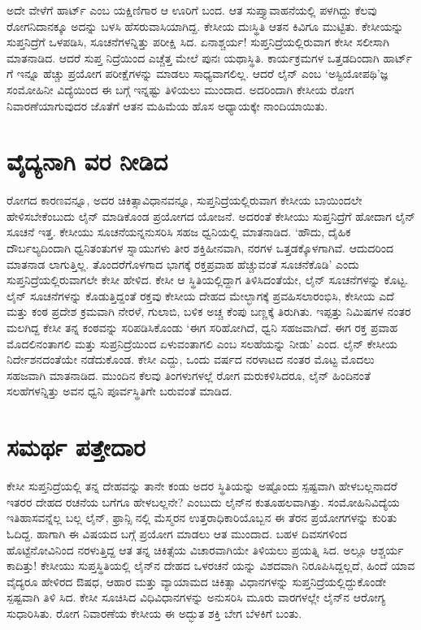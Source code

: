 ಅದೇ ವೇಳೆಗೆ ಹಾರ್ಟ್ ಎಂಬ ಯಕ್ಷಿಣಿಗಾರ ಆ ಊರಿಗೆ ಬಂದ. ಆತ ಸುಪ್ತ್ಯಾವಾಹನೆಯಲ್ಲಿ ಪಳಗಿದ್ದು ಕೆಲವು ರೋಗನಿದಾನಕ್ಕೂ ಅದನ್ನು ಬಳಸಿ ಹೆಸರುವಾಸಿಯಾಗಿದ್ದ. ಕೇಸೀಯ ದುಃಸ್ಥಿತಿ ಆತನ ಕಿವಿಗೂ ಮುಟ್ಟಿತು. ಕೇಸೀಯನ್ನು ಸುಪ್ತನಿದ್ರೆಗೆ ಒಳಪಡಿಸಿ, ಸೂಚನೆಗಳನ್ನಿತ್ತು ಪರೀಕ್ಷಿ ಸಿದ. ಏನಾಶ್ಚರ್ಯ! ಸುಪ್ತನಿದ್ರೆಯಲ್ಲಿರುವಾಗ ಕೇಸೀ ಸಲೀಸಾಗಿ ಮಾತನಾಡಿದ. ಆದರೆ ಸುಪ್ತ ನಿದ್ರೆಯಿಂದ ಎಚ್ಚೆತ್ತ ಮೇಲೆ ಪುನಃ ಯಥಾಸ್ಥಿತಿ. ಕಾರ್ಯಕ್ರಮಗಳ ಒತ್ತಡದಿಂದಾಗಿ ಹಾರ್ಟ್​ಗೆ ಇನ್ನೂ ಹೆಚ್ಚು ಪ್ರಯೋಗ ಪರೀಕ್ಷೆಗಳನ್ನು ಮಾಡಲು ಸಾಧ್ಯವಾಗಲಿಲ್ಲ. ಆದರೆ ಲೈನ್ ಎಂಬ ‘ಅಸ್ಟಿಯೋಪಥಿ’ಜ್ಞ ಸಂಮೋಹಿನೀ ವಿದ್ಯೆಯಿಂದ ಈ ಬಗ್ಗೆ ಇನ್ನಷ್ಟು ತಿಳಿಯಲು ಮುಂದಾದ. ಅದರಿಂದಾಗಿ ಕೇಸೀಯ ರೋಗ ನಿವಾರಣೆಯಾಗುವುದರ ಜೊತೆಗೆ ಆತನ ಮಹಿಮೆಯ ಹೊಸ ಅಧ್ಯಾಯಕ್ಕೇ ನಾಂದಿಯಾಯಿತು.


\section{ವೈದ್ಯನಾಗಿ ವರ ನೀಡಿದ}

ರೋಗದ ಕಾರಣವನ್ನೂ, ಅದರ ಚಿಕಿತ್ಸಾವಿಧಾನವನ್ನೂ, ಸುಪ್ತನಿದ್ರೆಯಲ್ಲಿರುವಾಗ ಕೇಸೀಯ ಬಾಯಿಂದಲೇ ಹೇಳಿಸಬೇಕೆಂಬುದು ಲೈನ್ ಮಾಡಿಕೊಂಡ ಪ್ರಯೋಗದ ಯೋಜನೆ. ಅದರಂತೆ ಕೇಸೀಯು ಸುಪ್ತನಿದ್ರೆಗೆ ಹೋದಾಗ ಲೈನ್ ಸೂಚನೆ ಇತ್ತ. ಕೇಸೀಯು ಸೂಚನೆಯನ್ನನುಸರಿಸಿ ಸಹಜ ಧ್ವನಿಯಲ್ಲಿ ಮಾತನಾಡಿದ. ‘ಹೌದು, ದೈಹಿಕ ದೌರ್ಬಲ್ಯದಿಂದಾಗಿ ಧ್ವನಿತಂತುಗಳ ಸ್ನಾಯುಗಳು ತೀರ ಶಕ್ತಿಹೀನವಾಗಿ, ನರಗಳ ಒತ್ತಡಕ್ಕೊಳಗಾಗಿವೆ. ಆದುದರಿಂದ ಮಾತನಾಡ ಲಾಗುತ್ತಿಲ್ಲ. ತೊಂದರೆಗೊಳಗಾದ ಭಾಗಕ್ಕೆ ರಕ್ತಪ್ರವಾಹ ಹೆಚ್ಚುವಂತೆ ಸೂಚನೆಕೊಡಿ’ ಎಂದು ಸುಪ್ತನಿದ್ರೆಯಲ್ಲಿರುವಾಗಲೇ ಕೇಸೀ ಹೇಳಿದ. ಕೇಸೀ ಆ ಸ್ಥಿತಿಯಲ್ಲಿದ್ದಾಗ ತಿಳಿಸಿದಂತೆಯೇ, ಲೈನ್ ಸೂಚನೆಗಳನ್ನು ಕೊಟ್ಟ. ಲೈನ್ ಸೂಚನೆಗಳನ್ನು ಕೊಡುತ್ತಿದ್ದಂತೆ ರಕ್ತವು ಕೇಸೀಯ ದೇಹದ ಮೇಲ್ಭಾಗಕ್ಕೆ ಪ್ರವಹಿಸಲಾರಂಭಿಸಿ, ಕೇಸೀಯ ಎದೆ ಮತ್ತು ಕಂಠ ಪ್ರದೇಶ ಕ್ರಮವಾಗಿ ನೇರಳೆ, ಗುಲಾಬಿ, ಬಳಿಕ ಅಚ್ಚ ಕೆಂಪು ಬಣ್ಣಕ್ಕೆ ತಿರುಗಿತು. ಇಪ್ಪತ್ತು ನಿಮಿಷಗಳ ನಂತರ ಮಲಗಿದ್ದ ಕೇಸೀ ತನ್ನ ಕಂಠವನ್ನು ಸರಿಪಡಿಸಿಕೊಂಡು ‘ಈಗ ಸರಿಹೋಗಿದೆ, ಧ್ವನಿ ಸಹಜವಾಗಿದೆ. ಈಗ ರಕ್ತ ಪ್ರವಾಹ ಮೊದಲಿನಂತಾಗಲಿ ಮತ್ತು ಸುಪ್ರನಿದ್ರೆಯಿಂದ ಏಳುವಂತಾಗಲಿ ಎಂಬ ಸಲಹೆಯನ್ನು ನೀಡು’ ಎಂದ. ಲೈನ್ ಕೇಸೀಯ ನಿರ್ದೇಶನದಂತೆಯೇ ನಡೆದುಕೊಂಡ. ಕೇಸೀ ಎದ್ದು, ಒಂದು ವರ್ಷದ ನರಳಾಟದ ನಂತರ ಮೊಟ್ಟ ಮೊದಲು ಸಹಜವಾಗಿ ಮಾತನಾಡಿದ. ಮುಂದಿನ ಕೆಲವು ತಿಂಗಳುಗಳಲ್ಲೆ ರೋಗ ಮರುಕಳಿಸಿದರೂ, ಲೈನ್ ಹಿಂದಿನಂತೆ ಸಲಹೆಗಳನ್ನಿತ್ತು ಅವನ ಧ್ವನಿ ಪೂರ್ವಸ್ಥಿತಿಗೇ ಬರುವಂತೆ ಮಾಡಿದ.


\section{ಸಮರ್ಥ ಪತ್ತೇದಾರ}

ಕೇಸೀ ಸುಪ್ತನಿದ್ರೆಯಲ್ಲಿ ತನ್ನ ದೇಹವನ್ನು ತಾನೇ ಕಂಡು ಅದರ ಸ್ಥಿತಿಯನ್ನು ಅಷ್ಟೊಂದು ಸ್ಪಷ್ಟವಾಗಿ ಹೇಳಬಲ್ಲನಾದರೆ ಇತರರ ದೇಹದ ರಚನೆಯ ಬಗೆಗೂ ಹೇಳಬಲ್ಲನೇ? ಎಂಬುದು ಲೈನ್​ನ ಕುತೂಹಲವಾಗಿತ್ತು. ಸಂಮೋಹಿನಿವಿದ್ಯೆಯ ಇತಿಹಾಸವನ್ನೆಲ್ಲ ಬಲ್ಲ ಲೈನ್, ಫ್ರಾನ್ಸಿ ನಲ್ಲಿ ಮೆಸ್ಮರನ ಉತ್ತರಾಧಿಕಾರಿಯೊಬ್ಬನ ಈ ತೆರನ ಪ್ರಯೋಗಗಳನ್ನು ಕುರಿತು ಓದಿದ್ದ. ಹಾಗಾಗಿ ಈ ವಿಷಯದ ಬಗ್ಗೆ ಪ್ರಯೋಗ ಮಾಡಲು ಆತ ಮುಂದಾದ. ಬಹಳ ದಿವಸಗಳಿಂದ ಹೊಟ್ಟೆನೋವಿನಿಂದ ನರಳುತ್ತಿದ್ದ ಆತ ತನ್ನ ಚಿಕಿತ್ಸೆಯ ವಿಚಾರವಾಗಿಯೇ ತಿಳಿಯಲು ಪ್ರಯತ್ನಿ ಸಿದ. ಅಲ್ಲೂ ಆಶ್ಚರ್ಯ ಕಾದಿತ್ತು! ಕೇಸೀಯು ಸುಪ್ತಸ್ಥಿತಿಯಲ್ಲಿ ಲೈನ್​ನ ದೇಹದ ಒಳರಚನೆ ಯನ್ನು ವಿಶದವಾಗಿ ನಿರೂಪಿಸಿದ್ದಲ್ಲದೆ, ಹಿಂದೆ ಯಾವ ವೈದ್ಯರೂ ಹೇಳಿರದ ಔಷಧ, ಆಹಾರ ಮತ್ತು ವ್ಯಾಯಾಮದ ಚಿಕಿತ್ಸಾ ವಿಧಾನಗಳನ್ನು ಸುಪ್ತನಿದ್ರೆಯಲ್ಲಿದ್ದುಕೊಂಡೇ ಸ್ಪಷ್ಟವಾಗಿ ತಿಳಿ ಸಿದ. ಕೇಸೀ ಸೂಚಿಸಿದ ವಿಧಿವಿಧಾನಗಳನ್ನು ಅನುಸರಿಸಿ ಮೂರು ವಾರಗಳಲ್ಲೇ ಲೈನ್​ನ ಆರೋಗ್ಯ ಸುಧಾರಿಸಿತು. ರೋಗ ನಿವಾರಣೆಯ ಕೇಸೀಯ ಈ ಅದ್ಭುತ ಶಕ್ತಿ ಬೇಗ ಬೆಳಕಿಗೆ ಬಂತು.

